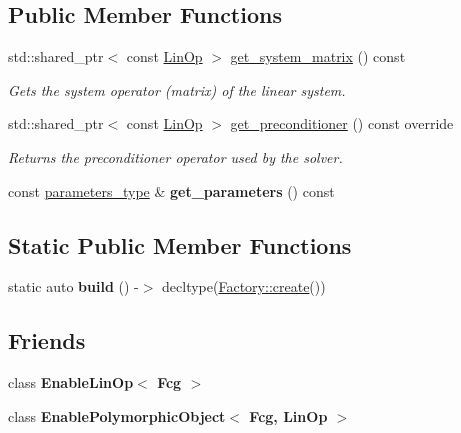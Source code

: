 \subsection*{Public Member Functions}
\begin{DoxyCompactItemize}
\item 
std\+::shared\+\_\+ptr$<$ const \hyperlink{classgko_1_1LinOp}{Lin\+Op} $>$ \hyperlink{classgko_1_1solver_1_1Fcg_aae8c67d27df239c18750845275605c87}{get\+\_\+system\+\_\+matrix} () const
\begin{DoxyCompactList}\small\item\em Gets the system operator (matrix) of the linear system. \end{DoxyCompactList}\item 
std\+::shared\+\_\+ptr$<$ const \hyperlink{classgko_1_1LinOp}{Lin\+Op} $>$ \hyperlink{classgko_1_1solver_1_1Fcg_a2dec8d13548e8b316d6598c9ee8b0881}{get\+\_\+preconditioner} () const override
\begin{DoxyCompactList}\small\item\em Returns the preconditioner operator used by the solver. \end{DoxyCompactList}\item 
\mbox{\label{classgko_1_1solver_1_1Fcg_a1beba109f32b69b3de58ecdfc17c1505}} 
const \hyperlink{structgko_1_1solver_1_1Fcg_1_1parameters__type}{parameters\+\_\+type} \& {\bfseries get\+\_\+parameters} () const
\end{DoxyCompactItemize}
\subsection*{Static Public Member Functions}
\begin{DoxyCompactItemize}
\item 
\mbox{\label{classgko_1_1solver_1_1Fcg_a1d60446bc2a5a04a63b3aebaa867b35d}} 
static auto {\bfseries build} () -\/$>$ decltype(\hyperlink{classgko_1_1EnableDefaultFactory_a1d077101d9e788e6c65f088612d14cc3}{Factory\+::create}())
\end{DoxyCompactItemize}
\subsection*{Friends}
\begin{DoxyCompactItemize}
\item 
\mbox{\label{classgko_1_1solver_1_1Fcg_a6bf004d0a3aa4e0763da2c239ffd4d67}} 
class {\bfseries Enable\+Lin\+Op$<$ Fcg $>$}
\item 
\mbox{\label{classgko_1_1solver_1_1Fcg_a5f1e6df5b9f436dafaf1d60c6005a8be}} 
class {\bfseries Enable\+Polymorphic\+Object$<$ Fcg, Lin\+Op $>$}
\end{DoxyCompactItemize}


